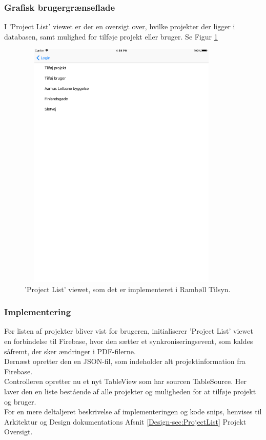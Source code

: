 \subsubsection{Grafisk brugergrænseflade}
I 'Project List' viewet er der en oversigt over, hvilke projekter der ligger i databasen, samt mulighed for tilføje projekt eller bruger. Se Figur \ref{fig:ProjectListView}
\begin{figure}[H] %
	\centering
	\includegraphics[height=12cm, width=10cm]{Design/Applikation/ProjektList/ProjectList}
	\caption{'Project List' viewet, som det er implementeret i Rambøll Tilsyn.}
	\label{fig:ProjectListView}
\end{figure}

\subsubsection{Implementering}
Før listen af projekter bliver vist for brugeren, initialiserer 'Project List' viewet en forbindelse til Firebase, hvor den sætter et synkroniseringsevent, som kaldes såfremt, der sker ændringer i PDF-filerne. \\
Dernæst opretter den en JSON-fil, som indeholder alt projektinformation fra Firebase. \\
Controlleren opretter nu et nyt TableView som har sourcen TableSource. Her laver den en liste bestående af alle projekter og muligheden for at tilføje projekt og bruger. \\
For en mere deltaljeret beskrivelse af implementeringen og kode snips, henvises til Arkitektur og Design dokumentations Afsnit \ref{Design-sec:ProjectList} Projekt Oversigt.

\clearpage